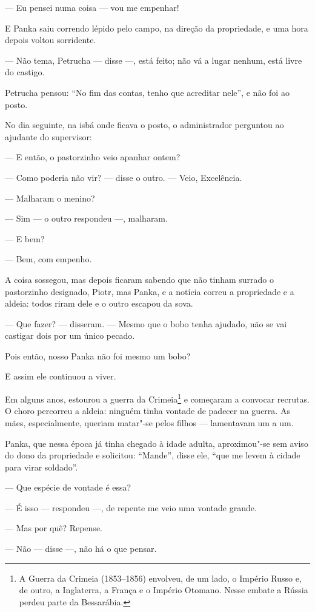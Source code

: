 --- Eu pensei numa coisa --- vou me empenhar!

E Panka saiu correndo lépido pelo campo, na direção da propriedade, e
uma hora depois voltou sorridente.

--- Não tema, Petrucha --- disse ---, está feito; não vá a lugar nenhum,
está livre do castigo.

Petrucha pensou: ``No fim das contas, tenho que acreditar nele'', e não
foi ao posto.

No dia seguinte, na isbá onde ficava o posto, o administrador perguntou
ao ajudante do supervisor:

--- E então, o pastorzinho veio apanhar ontem?

--- Como poderia não vir? --- disse o outro. --- Veio, Excelência.

--- Malharam o menino?

--- Sim --- o outro respondeu ---, malharam.

--- E bem?

--- Bem, com empenho.

A coisa sossegou, mas depois ficaram sabendo que não tinham surrado o
pastorzinho designado, Piotr, mas Panka, e a notícia correu a
propriedade e a aldeia: todos riram dele e o outro escapou da sova.

--- Que fazer? --- disseram. --- Mesmo que o bobo tenha ajudado, não se
vai castigar dois por um único pecado.

Pois então, nosso Panka não foi mesmo um bobo?

E assim ele continuou a viver.

Em alguns anos, estourou a guerra da Crimeia\footnote{A Guerra da
  Crimeia (1853--1856) envolveu, de um lado, o Império Russo e, de outro,
  a Inglaterra, a França e o Império Otomano. Nesse embate a Rússia
  perdeu parte da Bessarábia.} e começaram a convocar recrutas. O choro
percorreu a aldeia: ninguém tinha vontade de padecer na guerra. As mães,
especialmente, queriam matar"-se pelos filhos --- lamentavam um a um.

Panka, que nessa época já tinha chegado à idade adulta, aproximou"-se sem
aviso do dono da propriedade e solicitou: ``Mande'', disse ele, ``que me
levem à cidade para virar soldado''.

--- Que espécie de vontade é essa?

--- É isso --- respondeu ---, de repente me veio uma vontade grande.

--- Mas por quê? Repense.

--- Não --- disse ---, não há o que pensar.

